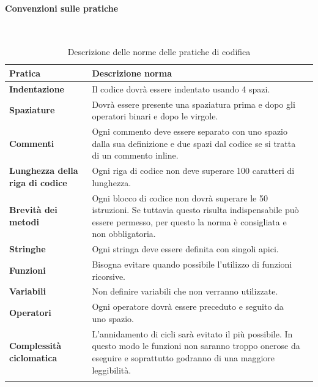 \paragraph*{Convenzioni sulle pratiche}
\
{
	\setlength{\freewidth}{\dimexpr\textwidth-0\tabcolsep}
	\renewcommand{\arraystretch}{1.5}
	\setlength{\aboverulesep}{0pt}
	\setlength{\belowrulesep}{0pt}
	\begin{longtable}{L{.210\freewidth} L{.6\freewidth} L{.080\freewidth}}
		\rowcolor{AzzurroGruppo!30}
		\textbf{Pratica} & \textbf{Descrizione norma} \\
		\toprule
		\endhead		
		\textbf{Indentazione} & Il codice dovrà essere indentato usando 4 spazi. \\ 
		\textbf{Spaziature} & Dovrà essere presente una spaziatura prima e dopo gli operatori binari e dopo le virgole. \\
		\textbf{Commenti} & Ogni commento deve essere separato con uno spazio dalla sua definizione e due spazi dal codice se si tratta di un commento inline. \\ 
		\textbf{Lunghezza della riga di codice} & Ogni riga di codice non deve superare 100 caratteri di lunghezza. \\
		\textbf{Brevità dei metodi} & Ogni blocco di codice non dovrà superare le 50 istruzioni. Se tuttavia questo risulta indispensabile può essere permesso, per questo la norma è consigliata e non obbligatoria.\\ 	
		\textbf{Stringhe} & Ogni stringa deve essere definita con singoli apici. \\
		\textbf{Funzioni} & Bisogna evitare quando possibile l'utilizzo di funzioni ricorsive.\\ 	
		\textbf{Variabili} & Non definire variabili che non verranno utilizzate.\\ 	
		\textbf{Operatori} & Ogni operatore dovrà essere preceduto e seguito da uno spazio.\\ 	
		\textbf{Complessità ciclomatica} & L'annidamento di cicli sarà evitato il più possibile. In questo modo le funzioni non saranno troppo onerose da eseguire e soprattutto godranno di una maggiore leggibilità. \\  			
		\bottomrule
		\hiderowcolors
		\caption{Descrizione delle norme delle pratiche di codifica}
	\end{longtable}
}
